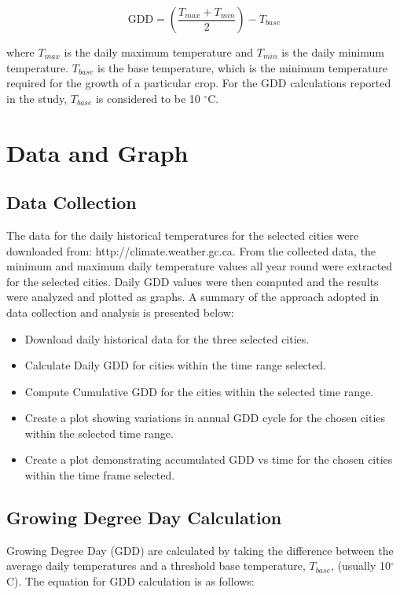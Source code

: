 \documentclass{article}
\begin{document}
\begin{equation}
\textrm{GDD} = \left(\frac{T_{max} + T_{min}}{2}\right) - T_{base}
\label{eqn:gdd}
\end{equation}

\noindent where {$T_{max}$} is the daily maximum temperature and {$T_{min}$} is the daily minimum temperature. {$T_{base}$} is the base temperature, which is the minimum temperature required for the growth of a particular crop. For the GDD calculations reported in the study, {$T_{base}$} is considered to be 10 $^{\circ}$C.\\


\section{ \bf Data and Graph}
\subsection{Data Collection}
The data for the daily historical temperatures for the selected cities were downloaded from: http://climate.weather.gc.ca. From the collected data, the minimum and maximum daily temperature values all year round were extracted for the selected cities. Daily GDD values were then computed and the results were analyzed and plotted as graphs. A summary of the approach adopted in data collection and analysis is presented below:

\begin{itemize}
\item Download daily historical data for the three selected cities. 
\item Calculate Daily GDD for cities within the time range selected. 
\item Compute Cumulative GDD for the cities within the selected time range.
\item Create a plot showing variations in annual GDD cycle for the chosen cities within the selected time range. 
\item Create a plot demonstrating accumulated GDD vs time for the chosen cities within the time frame selected. 
\end{itemize}

\subsection{Growing Degree Day Calculation}
Growing Degree Day (GDD) are calculated by taking the difference between the average daily temperatures and a threshold base temperature, $T_{base}$, (usually 10$^{\circ}$C). The equation for GDD calculation is as follows: \vspace{5mm}
\end{document}
